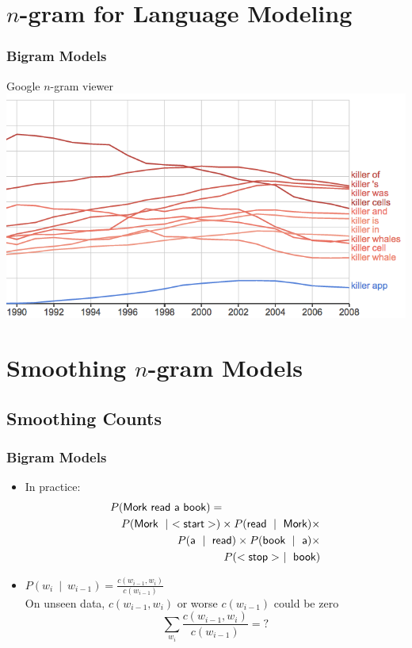 \section{$n$-gram for Language Modeling}
\frame{\tableofcontents[currentsection]}

\begin{frame}
\frametitle{Bigram Models}
\centering
\begin{block}{Google $n$-gram viewer}
\includegraphics[scale=0.45]{figures/killer-ngrams.png}
\end{block}
\end{frame}

\section{Smoothing $n$-gram Models}
\frame{\tableofcontents[currentsection]}
\subsection{Smoothing Counts}

\begin{frame}
\frametitle{Bigram Models}
\begin{itemize}[<+->]
\item
In practice: 
\begin{eqnarray*}
\lefteqn{P(\textsf{Mork read a book})=}\\
&& P(\textsf{Mork}~\mid~<\textsf{start}>) \times P(\textsf{read}~\mid~\textsf{Mork}) \times \\
&& P(\textsf{a}~\mid~\textsf{read}) \times P(\textsf{book}~\mid~\textsf{a}) \times \\
&& P(<\textsf{stop}>~\mid~\textsf{book})
\end{eqnarray*}

\item $P(w_i~\mid~w_{i-1}) = \frac{ c(w_{i-1},w_i) } { c(w_{i-1}) }$ \\
 On unseen data, $c(w_{i-1},w_i)$ or worse $c(w_{i-1})$ could be zero
\[ \sum_{w_i} \frac{ c(w_{i-1},w_i) } { c(w_{i-1}) } = ? \]

\end{itemize}
\end{frame}



